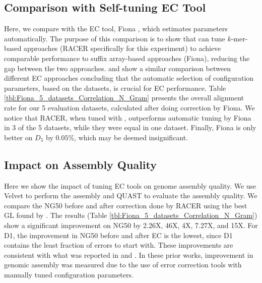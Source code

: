 \subsection{Comparison with Self-tuning EC Tool}
\vspace{-5pt}
Here, we compare \name with the EC tool, Fiona \cite{schulz2014fiona}, which estimates parameters automatically.
The purpose of this comparison is to show that \name can tune $k$-mer-based approaches (RACER specifically for this experiment) to achieve comparable performance to suffix array-based approaches (\eg Fiona), reducing the gap between the two approaches.
\cite{yang2012survey} and \cite{molnar2014correcting} show a similar comparison between different EC approaches concluding that the automatic selection of configuration parameters, based on the datasets, is crucial for EC performance.
 Table \ref{tbl:Fiona_5_datasets_Correlation_N_Gram} presents the overall alignment rate for our 5 evaluation datasets, calculated after doing correction by Fiona. We notice that RACER, when tuned with \name, outperforms automatic tuning by Fiona in 3 of the 5 datasets, while they were equal in one dataset. Finally, Fiona is only better on $D_{5} $ by $0.05\%$, which may be deemed insignificant.  


\vspace{-12pt}
\subsection{Impact on Assembly Quality}
\vspace{-5pt}

Here we show the impact of tuning EC tools on genome assembly quality. We use Velvet \cite{zerbino2008velvet} to perform the assembly and QUAST \cite{gurevich2013quast} to evaluate the assembly quality. We compare the NG50 before and after correction done by RACER using the best GL found by \name. The results (Table \ref{tbl:Fiona_5_datasets_Correlation_N_Gram}) show a significant improvement on NG50 by 2.26X, 46X, 4X, 7.27X, and 15X. For D1, the improvement in NG50 before and after EC is the lowest, since D1 contains the least fraction of errors to start with. 
These improvements are consistent with what was reported in \cite{heydari2017evaluation} and \cite{greenfield2014blue}. In these prior works, improvement in genomic assembly was measured due to the use of error correction tools
with manually tuned configuration parameters.


